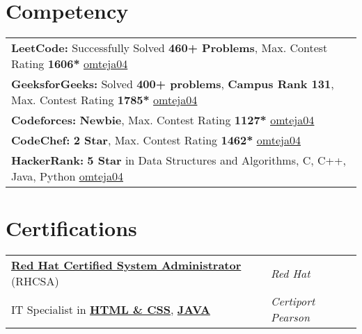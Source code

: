 \documentclass[a4paper,10pt]{article}
\begin{document}
\section{Competency}
\begin{tabularx}{\linewidth}{@{} X@{}}	
    \textbf{LeetCode:} Successfully Solved \textbf{460+ Problems}, Max. Contest Rating \textbf{1606*} \hfill \href{https://www.leetcode.com/omteja04}{\underline{omteja04}} \\
    \textbf{GeeksforGeeks:} Solved \textbf{400+ problems}, \textbf{Campus Rank 131}, Max. Contest Rating \textbf{1785*} \hfill \href{https://www.geeksforgeeks.org/user/omteja04/}{\underline{omteja04}} \\
    \textbf{Codeforces:} \textbf{Newbie}, Max. Contest  Rating \textbf{1127*}
    \hfill  \href{https://codeforces.com/profile/omteja04}{\underline{omteja04}} \\
    \textbf{CodeChef:} \textbf{2 Star}, Max. Contest Rating \textbf{1462*} \hfill \href{https://www.codechef.com/users/omteja04}{\underline{omteja04}} \\
    \textbf{HackerRank:} \textbf{5 Star} in Data Structures and Algorithms, C, C++, Java, Python \hfill \href{https://www.hackerrank.com/profile/omteja04}{\underline{omteja04}} \\
\end{tabularx}
\section{Certifications}
\begin{tabularx}{\linewidth}{@{} l X@{}}
    \href{https://rhtapps.redhat.com/verify?certId=240-110-783}{\textbf{Red Hat Certified System Administrator}} (RHCSA) & \textcolor{bullets}{\emph{Red Hat}} \\
    IT Specialist in \href{https://www.credly.com/badges/aea2b491-a0e3-4ed8-8e4b-2da4ec311639/public_url}{\textbf{HTML \& CSS}}, \href{https://www.credly.com/badges/17ee233e-54bd-4955-94a4-999a9468809f/public_url}{\textbf{JAVA}} &  \textcolor{bullets}{\emph{Certiport Pearson}}
\end{tabularx}
\vfill
\end{document}
